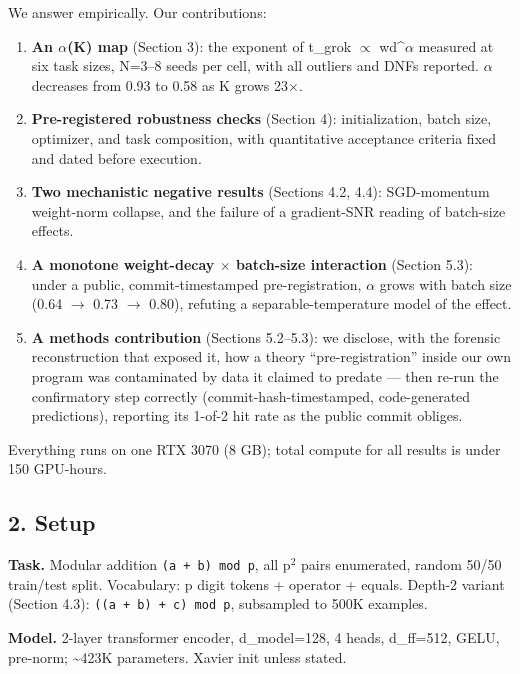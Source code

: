 \documentclass[
  11pt,
]{article}
\providecommand{\tightlist}{%
  \setlength{\itemsep}{0pt}\setlength{\parskip}{0pt}}
\begin{document}
We answer empirically. Our contributions:

\begin{enumerate}
\def\labelenumi{\arabic{enumi}.}
\tightlist
\item
  \textbf{An $\alpha$(K) map} (Section 3): the exponent of t\_grok $\propto$ wd\^{}$\alpha$
  measured at six task sizes, N=3--8 seeds per cell, with all outliers
  and DNFs reported. \textbar $\alpha$\textbar{} decreases from 0.93 to 0.58 as
  K grows 23$\times$.
\item
  \textbf{Pre-registered robustness checks} (Section 4): initialization,
  batch size, optimizer, and task composition, with quantitative
  acceptance criteria fixed and dated before execution.
\item
  \textbf{Two mechanistic negative results} (Sections 4.2, 4.4):
  SGD-momentum weight-norm collapse, and the failure of a gradient-SNR
  reading of batch-size effects.
\item
  \textbf{A monotone weight-decay $\times$ batch-size interaction} (Section
  5.3): under a public, commit-timestamped pre-registration,
  \textbar $\alpha$\textbar{} grows with batch size (0.64 $\to$ 0.73 $\to$ 0.80),
  refuting a separable-temperature model of the effect.
\item
  \textbf{A methods contribution} (Sections 5.2--5.3): we disclose, with
  the forensic reconstruction that exposed it, how a theory
  ``pre-registration'' inside our own program was contaminated by data
  it claimed to predate --- then re-run the confirmatory step correctly
  (commit-hash-timestamped, code-generated predictions), reporting its
  1-of-2 hit rate as the public commit obliges.
\end{enumerate}

Everything runs on one RTX 3070 (8 GB); total compute for all results is
under 150 GPU-hours.

\subsection{2. Setup}\label{setup}

\textbf{Task.} Modular addition \texttt{(a\ +\ b)\ mod\ p}, all p$^2$ pairs
enumerated, random 50/50 train/test split. Vocabulary: p digit tokens +
operator + equals. Depth-2 variant (Section 4.3):
\texttt{((a\ +\ b)\ +\ c)\ mod\ p}, subsampled to 500K examples.

\textbf{Model.} 2-layer transformer encoder, d\_model=128, 4 heads,
d\_ff=512, GELU, pre-norm; \textasciitilde423K parameters. Xavier init
unless stated.
\end{document}
